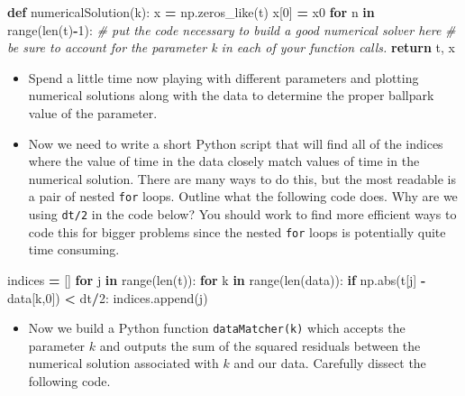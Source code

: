 \documentclass[
]{book}
\newenvironment{Shaded}{\begin{snugshade}}{\end{snugshade}}
\newcommand{\BuiltInTok}[1]{#1}
\newcommand{\CommentTok}[1]{\textcolor[rgb]{0.56,0.35,0.01}{\textit{#1}}}
\newcommand{\ControlFlowTok}[1]{\textcolor[rgb]{0.13,0.29,0.53}{\textbf{#1}}}
\newcommand{\DecValTok}[1]{\textcolor[rgb]{0.00,0.00,0.81}{#1}}
\newcommand{\KeywordTok}[1]{\textcolor[rgb]{0.13,0.29,0.53}{\textbf{#1}}}
\newcommand{\NormalTok}[1]{#1}
\newcommand{\OperatorTok}[1]{\textcolor[rgb]{0.81,0.36,0.00}{\textbf{#1}}}
\providecommand{\tightlist}{%
  \setlength{\itemsep}{0pt}\setlength{\parskip}{0pt}}
\theoremstyle{definition}
\theoremstyle{definition}
\theoremstyle{definition}
\theoremstyle{remark}
\begin{document}
\begin{Shaded}
\begin{Highlighting}[]
\KeywordTok{def}\NormalTok{ numericalSolution(k):}
\NormalTok{    x }\OperatorTok{=}\NormalTok{ np.zeros\_like(t)}
\NormalTok{    x[}\DecValTok{0}\NormalTok{] }\OperatorTok{=}\NormalTok{ x0}
    \ControlFlowTok{for}\NormalTok{ n }\KeywordTok{in} \BuiltInTok{range}\NormalTok{(}\BuiltInTok{len}\NormalTok{(t)}\OperatorTok{{-}}\DecValTok{1}\NormalTok{):}
        \CommentTok{\# put the code necessary to build a good numerical solver here}
        \CommentTok{\# be sure to account for the parameter k in each of your function calls.}
    \ControlFlowTok{return}\NormalTok{ t, x}
\end{Highlighting}
\end{Shaded}

\begin{itemize}
\item
  Spend a little time now playing with different parameters and plotting numerical solutions along with the data to determine the proper ballpark value of the parameter.
\item
  Now we need to write a short Python script that will find all of the indices where the value of time in the data closely match values of time in the numerical solution. There are many ways to do this, but the most readable is a pair of nested \texttt{for} loops. Outline what the following code does. Why are we using \texttt{dt/2} in the code below? You should work to find more efficient ways to code this for bigger problems since the nested \texttt{for} loops is potentially quite time consuming.
\end{itemize}

\begin{Shaded}
\begin{Highlighting}[]
\NormalTok{indices }\OperatorTok{=}\NormalTok{ []}
\ControlFlowTok{for}\NormalTok{ j }\KeywordTok{in} \BuiltInTok{range}\NormalTok{(}\BuiltInTok{len}\NormalTok{(t)):}
    \ControlFlowTok{for}\NormalTok{ k }\KeywordTok{in} \BuiltInTok{range}\NormalTok{(}\BuiltInTok{len}\NormalTok{(data)):}
        \ControlFlowTok{if}\NormalTok{ np.}\BuiltInTok{abs}\NormalTok{(t[j] }\OperatorTok{{-}}\NormalTok{ data[k,}\DecValTok{0}\NormalTok{]) }\OperatorTok{\textless{}}\NormalTok{ dt}\OperatorTok{/}\DecValTok{2}\NormalTok{:}
\NormalTok{            indices.append(j)}
\end{Highlighting}
\end{Shaded}

\begin{itemize}
\tightlist
\item
  Now we build a Python function \texttt{dataMatcher(k)} which accepts the parameter \(k\) and outputs the sum of the squared residuals between the numerical solution associated with \(k\) and our data. Carefully dissect the following code.
\end{itemize}
\end{document}
